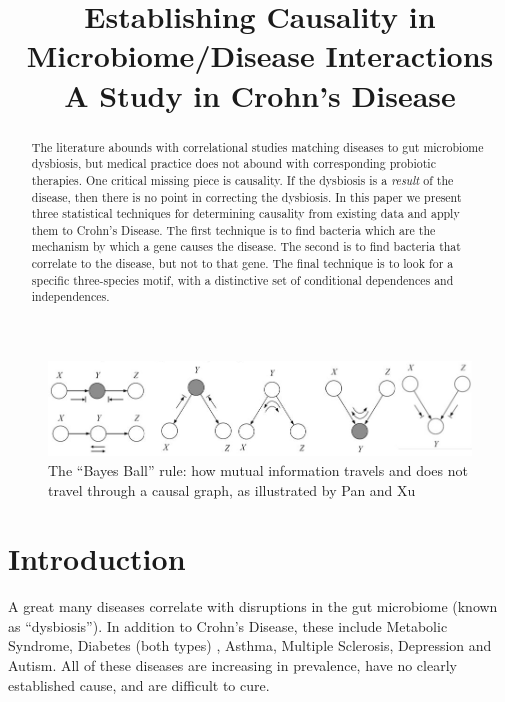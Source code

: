 \documentclass[a4paper]{article}
\title{Establishing Causality in Microbiome/Disease Interactions\\A
  Study in Crohn's Disease}
\begin{document}
\ninept

    \maketitle

\begin{abstract}
The literature abounds with correlational studies matching diseases to
gut microbiome dysbiosis, but medical practice does not abound with
corresponding probiotic therapies.  One critical missing piece is
causality.  If the dysbiosis is a \textit{result} of the disease,
then there is no point in correcting the dysbiosis.  In this paper we
present three statistical techniques for determining causality from
existing data and apply them to Crohn's Disease.  The first technique
is to find bacteria which are the mechanism by which a gene causes the
disease.  The second is to find bacteria that correlate to the
disease, but not to that gene.  The final technique is to look for a
specific three-species motif, with a distinctive set of conditional
dependences and independences.
\end{abstract}

\begin{figure}[t]
  \includegraphics[width=\textwidth]{bayesball}
  \caption{The ``Bayes Ball'' rule: how mutual information travels and
  does not travel through a causal graph, as illustrated by Pan and
  Xu\cite{bayesball} }
\end{figure}

\section{Introduction}

A great many diseases correlate with disruptions in the gut microbiome
(known as “dysbiosis”).  In addition to Crohn's Disease, these include
Metabolic Syndrome, Diabetes (both types)\cite{obesity} , Asthma, Multiple
Sclerosis\cite{autoim}, Depression and Autism\cite{cns}.  All of these diseases are
increasing in prevalence, have no clearly established cause, and are
difficult to cure.
\end{document}
